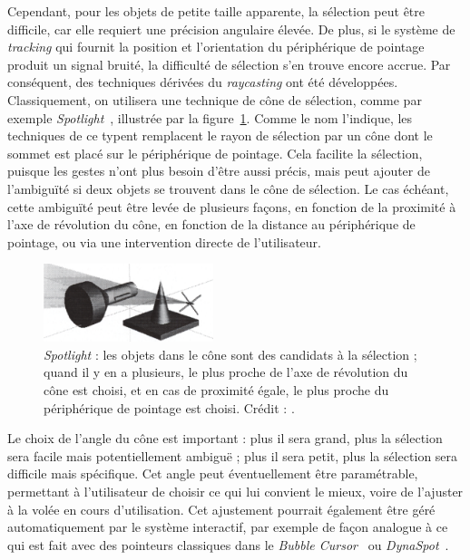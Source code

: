 	Cependant, pour les objets de petite taille apparente, la sélection peut être difficile, car elle requiert une précision angulaire élevée. De plus, si le système de \emph{tracking} qui fournit la position et l'orientation du périphérique de pointage produit un signal bruité, la difficulté de sélection s'en trouve encore accrue. Par conséquent, des techniques dérivées du \emph{raycasting} ont été développées. Classiquement, on utilisera une technique de cône de sélection, comme par exemple \emph{Spotlight}~\cite{liang1994jdcad}, illustrée par la figure~\ref{fig:spotlight}. Comme le nom l'indique, les techniques de ce typent remplacent le rayon de sélection par un cône dont le sommet est placé sur le périphérique de pointage. Cela facilite la sélection, puisque les gestes n'ont plus besoin d'être aussi précis, mais peut ajouter de l'ambiguïté si deux objets se trouvent dans le cône de sélection. Le cas échéant, cette ambiguïté peut être levée de plusieurs façons, en fonction de la proximité à l'axe de révolution du cône, en fonction de la distance au périphérique de pointage, ou via une intervention directe de l'utilisateur.
	
	\begin{figure}
		\centering
		\includegraphics[width=0.44\textwidth]{figures/ch2/spotlight}
		\caption[Cône de sélection : \emph{Spotlight}]{\emph{Spotlight} : les objets dans le cône sont des candidats à la sélection ; quand il y en a plusieurs, le plus proche de l'axe de révolution du cône est choisi, et en cas de proximité égale, le plus proche du périphérique de pointage est choisi. Crédit : \cite{liang1994jdcad}.}
		\label{fig:spotlight}
	\end{figure}
	
	Le choix de l'angle du cône est important : plus il sera grand, plus la sélection sera facile mais potentiellement ambiguë ; plus il sera petit, plus la sélection sera difficile mais spécifique. Cet angle peut éventuellement être paramétrable, permettant à l'utilisateur de choisir ce qui lui convient le mieux, voire de l'ajuster à la volée en cours d'utilisation. Cet ajustement pourrait également être géré automatiquement par le système interactif, par exemple de façon analogue à ce qui est fait avec des pointeurs classiques dans le \emph{Bubble Cursor}~\cite{grossman2005bubble} ou \emph{DynaSpot}~\cite{chapuis2009dynaspot}.
	

